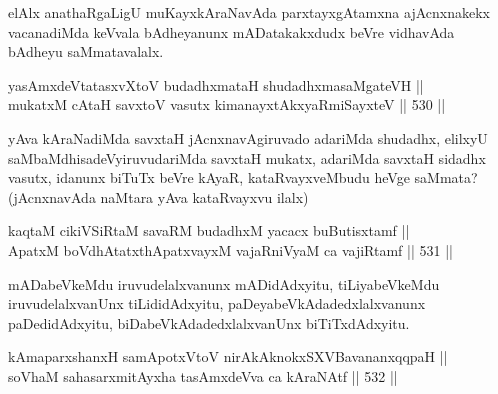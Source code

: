\begin{artha}
elAlx anathaRgaLigU muKayxkAraNavAda parxtayxgAtamxna ajAcnxnakekx
vacanadiMda keVvala bAdheyanunx mADatakakxdudx beVre vidhavAda bAdheyu
saMmatavalalx.
\end{artha}

\begin{shl}
yasAmxdeVtatasxvXtoV budadhxmataH shudadhxmasaMgateVH || \\
mukatxM cAtaH savxtoV vasutx kimanayxtAkxyaRmiSayxteV \hfill || 530 ||  
\end{shl}

\begin{artha}
yAva kAraNadiMda savxtaH jAcnxnavAgiruvado adariMda shudadhx, elilxyU
saMbaMdhisadeVyiruvudariMda savxtaH mukatx, adariMda savxtaH sidadhx
vasutx, idanunx biTuTx beVre kAyaR, kataRvayxveMbudu heVge saMmata?
(jAcnxnavAda naMtara yAva kataRvayxvu ilalx)
\end{artha}






\begin{shl}
kaqtaM cikiVSiRtaM savaRM budadhxM yacacx buButisxtamf || \\
ApatxM boVdhAtatxthA\s \s patxvayxM vajaRniVyaM ca vajiRtamf \hfill || 531 ||  
\end{shl}

\begin{artha}
mADabeVkeMdu iruvudelalxvanunx mADidAdxyitu, tiLiyabeVkeMdu
iruvudelalxvanUnx tiLididAdxyitu, paDeyabeVkAdadedxlalxvanunx
paDedidAdxyitu, biDabeVkAdadedxlalxvanUnx biTiTxdAdxyitu.
\end{artha}


\begin{shl}
kAmaparxshanxH samApotxV\s toV nirAkAknokxSXV\s BavananxqqpaH || \\
soV\s haM sahasarxmitAyxha tasAmxdeVva ca kAraNAtf \hfill || 532 ||  
\end{shl}

